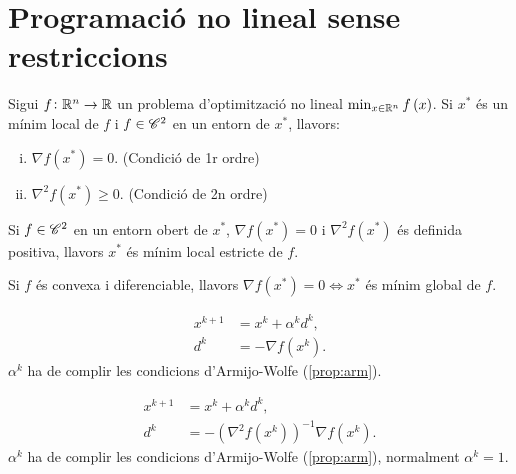 \section{Programaci\'o no lineal sense restriccions}

\begin{teo*}
    Sigui $f \colon \mathbb{R}^n \to \mathbb{R}$ un problema d'optimitzaci\'o no lineal $\min_{x\in\mathbb{R}^n} f\left( x \right)$. Si $x^*$ \'es un m\'inim local de $f$ i $f \in \mathscr{C}^2$ en un entorn de $x^*$, llavors:
    \begin{enumerate}[i)]
        \item $\nabla f\left( x^* \right) = 0$. (Condici\'o de 1r ordre)
        \item $\nabla^2 f\left( x^* \right) \geq 0$. (Condici\'o de 2n ordre)
    \end{enumerate}
\end{teo*}
\begin{teo*}
    Si $f \in \mathscr{C}^2$ en un entorn obert de $x^*$, $\nabla f\left( x^* \right) = 0$ i $\nabla^2 f\left( x^* \right)$ \'es definida positiva, llavors $x^*$ \'es m\'inim local estricte de $f$.
\end{teo*}
\begin{teo*}
    Si $f$ \'es convexa i diferenciable, llavors $\nabla f\left( x^* \right) = 0 \iff x^*$ \'es m\'inim global de $f$.
\end{teo*}
\begin{met} 
    \begin{align*}
        x^{k+1} &= x^k + \alpha^kd^k, \\
        d^k &= -\nabla f\left( x^k \right).
    \end{align*}
    $\alpha^k$ ha de complir les condicions d'Armijo-Wolfe (\ref{prop:arm}).
\end{met}
\begin{met} 
    \begin{align*}
        x^{k+1} &= x^k + \alpha^kd^k, \\
        d^k &= -\left( \nabla^2 f\left( x^k \right) \right)^{-1} \nabla f\left( x^k \right).
    \end{align*}
    $\alpha^k$ ha de complir les condicions d'Armijo-Wolfe (\ref{prop:arm}), normalment $\alpha^k = 1$.
\end{met}
